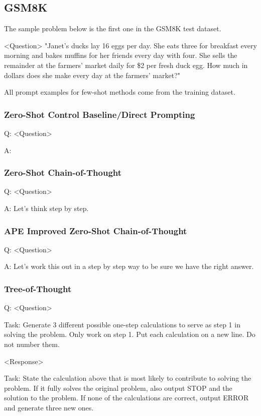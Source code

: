 \documentclass[11pt]{article}
\begin{document}
\subsection{GSM8K}

The sample problem below is the first one in the GSM8K test dataset. \cite{cobbe_training_2021}

<Question> "Janet's ducks lay 16 eggs per day. She eats three for breakfast every morning and bakes muffins for her friends every day with four. She sells the remainder at the farmers' market daily for \$2 per fresh duck egg. How much in dollars does she make every day at the farmers' market?"

All prompt examples for few-shot methods come from the training dataset.

\subsubsection*{Zero-Shot Control Baseline/Direct Prompting}

Q: <Question>

A:

\subsubsection*{Zero-Shot Chain-of-Thought}

Q: <Question>

A: Let's think step by step.

\subsubsection*{APE Improved Zero-Shot Chain-of-Thought}

Q: <Question>

A: Let's work this out in a step by step way to be sure we have the right answer.

\subsubsection*{Tree-of-Thought}

Q: <Question>

Task: Generate 3 different possible one-step calculations to serve as step 1 in solving the problem. Only work on step 1. Put each calculation on a new line. Do not number them.

<Response>

Task: State the calculation above that is most likely to contribute to solving the problem. If it fully solves the original problem, also output STOP and the solution to the problem. If none of the calculations are correct, output ERROR and generate three new ones.
\end{document}
